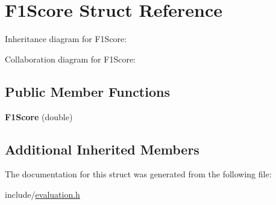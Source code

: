 \hypertarget{structF1Score}{}\section{F1\+Score Struct Reference}
\label{structF1Score}


Inheritance diagram for F1\+Score\+:


Collaboration diagram for F1\+Score\+:
\subsection*{Public Member Functions}
\begin{DoxyCompactItemize}
\item 
\mbox{\label{structF1Score_aaf685f7cc41a614683ba9621a411fa23}} 
{\bfseries F1\+Score} (double)
\end{DoxyCompactItemize}
\subsection*{Additional Inherited Members}


The documentation for this struct was generated from the following file\+:\begin{DoxyCompactItemize}
\item 
include/\hyperlink{evaluation_8h}{evaluation.\+h}\end{DoxyCompactItemize}
